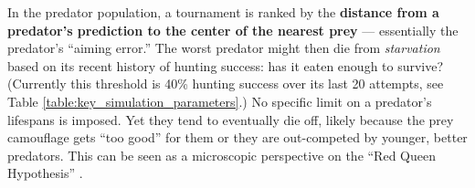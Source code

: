 \documentclass[letterpaper]{article}
\newcommand{\jargon}[1]{\textit{#1}}
\newcommand{\runID}{\footnotesize}
\newcommand{\igfour}[1]{\texttt{[image: \#1]}}
\begin{document}
\par
In the predator population, a tournament is ranked by the \textbf{distance from a predator's prediction to the center of the nearest prey} --- essentially the predator's ``aiming error.'' The worst predator might then die from \jargon{starvation} based on its recent history of hunting success: has it eaten enough to survive? (Currently this threshold is 40\% hunting success over its last 20 attempts, see Table \ref{table:key_simulation_parameters}.) No specific limit on a predator's lifespans is imposed. Yet they tend to eventually die off, likely because the prey camouflage gets ``too good'' for them or they are out-competed by younger, better predators. This can be seen as a microscopic perspective on the ``Red Queen Hypothesis'' \citep{van_valen_new_1973}.




\end{document}
